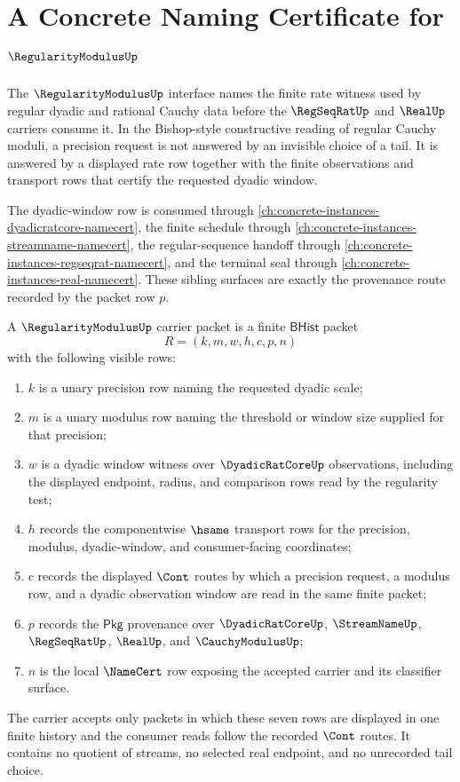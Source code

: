 \chapter{A Concrete Naming Certificate for $\RegularityModulusUp$}
\label{ch:concrete-instances-regularitymodulus-namecert}

The $\RegularityModulusUp$ interface names the finite rate witness used by
regular dyadic and rational Cauchy data before the $\RegSeqRatUp$ and
$\RealUp$ carriers consume it. In the Bishop-style constructive reading of
regular Cauchy moduli, a precision request is not answered by an invisible
choice of a tail. It is answered by a displayed rate row together with the
finite observations and transport rows that certify the requested dyadic
window.

The dyadic-window row is consumed through
\autoref{ch:concrete-instances-dyadicratcore-namecert}, the finite schedule
through \autoref{ch:concrete-instances-streamname-namecert}, the
regular-sequence handoff through
\autoref{ch:concrete-instances-regseqrat-namecert}, and the terminal seal
through \autoref{ch:concrete-instances-real-namecert}. These sibling surfaces
are exactly the provenance route recorded by the packet row $p$.

\begin{definition}
\label{def:regularitymodulus-dyadic-window-carrier}
A $\RegularityModulusUp$ carrier packet is a finite $\mathsf{BHist}$ packet
$$
R=(k,m,w,h,c,p,n)
$$
with the following visible rows:
\begin{enumerate}
\item $k$ is a unary precision row naming the requested dyadic scale;
\item $m$ is a unary modulus row naming the threshold or window size supplied
  for that precision;
\item $w$ is a dyadic window witness over $\DyadicRatCoreUp$ observations,
  including the displayed endpoint, radius, and comparison rows read by the
  regularity test;
\item $h$ records the componentwise $\hsame$ transport rows for the precision,
  modulus, dyadic-window, and consumer-facing coordinates;
\item $c$ records the displayed $\Cont$ routes by which a precision request,
  a modulus row, and a dyadic observation window are read in the same finite
  packet;
\item $p$ records the $\mathsf{Pkg}$ provenance over $\DyadicRatCoreUp$,
  $\StreamNameUp$, $\RegSeqRatUp$, $\RealUp$, and $\CauchyModulusUp$;
\item $n$ is the local $\NameCert$ row exposing the accepted carrier and its
  classifier surface.
\end{enumerate}
The carrier accepts only packets in which these seven rows are displayed in
one finite history and the consumer reads follow the recorded $\Cont$ routes.
It contains no quotient of streams, no selected real endpoint, and no
unrecorded tail choice.
\end{definition}

